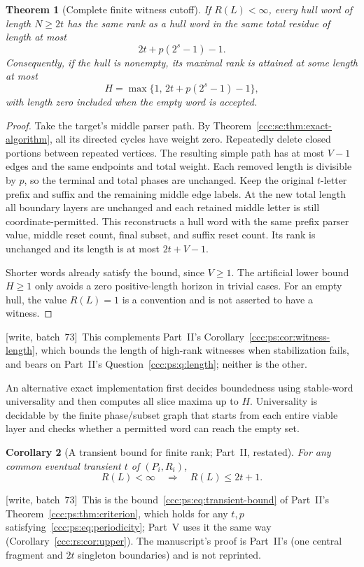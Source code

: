 \documentclass[11pt,letterpaper]{article}
\newtheorem{theorem}{Theorem}[section]
\newtheorem{corollary}[theorem]{Corollary}
\theoremstyle{definition}
\theoremstyle{remark}
\newcommand{\wsevthree}{\textup{[write, batch~73]}}
\begin{document}
\begin{theorem}[Complete finite witness cutoff]\label{ccc:sc:thm:cutoff}
If $R(L)<\infty$, every hull word of length $N\ge2t$ has the same rank as a hull word in the same total residue of length at most
\[
 2t+p(2^s-1)-1.
\]
Consequently, if the hull is nonempty, its maximal rank is attained at some length at most
\begin{equation}\label{ccc:sc:eq:cutoff}
 H=\max\{1,\,2t+p(2^s-1)-1\},
\end{equation}
with length zero included when the empty word is accepted.
\end{theorem}
\begin{proof}
Take the target's middle parser path. By Theorem~\ref{ccc:sc:thm:exact-algorithm}, all its directed cycles have weight zero. Repeatedly delete closed portions between repeated vertices. The resulting simple path has at most $V-1$ edges and the same endpoints and total weight. Each removed length is divisible by $p$, so the terminal and total phases are unchanged. Keep the original $t$-letter prefix and suffix and the remaining middle edge labels. At the new total length all boundary layers are unchanged and each retained middle letter is still coordinate-permitted. This reconstructs a hull word with the same prefix parser value, middle reset count, final subset, and suffix reset count. Its rank is unchanged and its length is at most $2t+V-1$.

Shorter words already satisfy the bound, since $V\ge1$. The artificial lower bound $H\ge1$ only avoids a zero positive-length horizon in trivial cases. For an empty hull, the value $R(L)=1$ is a convention and is not asserted to have a witness.
\end{proof}
\wsevthree\ This complements Part~II's
Corollary~\ref{ccc:ps:cor:witness-length}, which bounds the length of
high-rank witnesses when stabilization fails, and bears on Part~II's
Question~\ref{ccc:ps:q:length}; neither is the other.

An alternative exact implementation first decides boundedness using stable-word universality and then computes all slice maxima up to $H$. Universality is decidable by the finite phase/subset graph that starts from each entire viable layer and checks whether a permitted word can reach the empty set.

\begin{corollary}[A transient bound for finite rank; Part~II, restated]\label{ccc:sc:cor:transient}
For any common eventual transient $t$ of $(P_i,R_i)$,
\[
 R(L)<\infty\quad\Longrightarrow\quad R(L)\le2t+1.
\]
\end{corollary}
\noindent\wsevthree\ This is the bound~\eqref{ccc:ps:eq:transient-bound} of
Part~II's Theorem~\ref{ccc:ps:thm:criterion}, which holds for any $t,p$
satisfying~\eqref{ccc:ps:eq:periodicity}; Part~V uses it the same way
(Corollary~\ref{ccc:rs:cor:upper}). The manuscript's proof is Part~II's
(one central fragment and $2t$ singleton boundaries) and is not reprinted.
\end{document}
